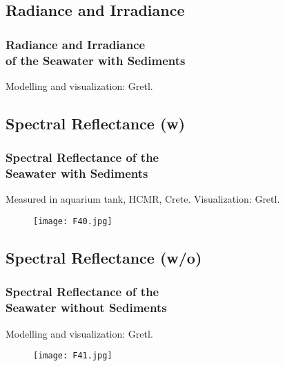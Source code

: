\documentclass[pdflatex,compress,9pt,
	xcolor={dvipsnames,dvipsnames,svgnames,x11names,table},
	hyperref={colorlinks = true,breaklinks = true, urlcolor = NavyBlue, breaklinks = true}]{beamer}
\begin{document}
\subsection{Radiance and Irradiance}
\begin{frame}\frametitle{Radiance and Irradiance \\of the Seawater \alert{with} Sediments}
Modelling and visualization: Gretl.
\begin{figure}[H]
	\centering
			\hspace{1mm}
\end{figure}
\begin{figure}[H]
	\centering
			\hspace{1mm}
\end{figure}
\end{frame}

\subsection{Spectral Reflectance (w)}
\begin{frame}\frametitle{Spectral Reflectance of the\\ Seawater \alert{with} Sediments}
Measured in aquarium tank, HCMR, Crete. Visualization: \ac{Gretl}.
\begin{figure}[H]
	\centering
		\texttt{[image: F40.jpg]}
\end{figure}
\end{frame}

\subsection{Spectral Reflectance (w/o)}
\begin{frame}\frametitle{Spectral Reflectance of the\\ Seawater \alert{without} Sediments}
Modelling and visualization: \ac{Gretl}.
\begin{figure}[H]
	\centering
		\texttt{[image: F41.jpg]}
\end{figure}
\end{frame}
\end{document}
